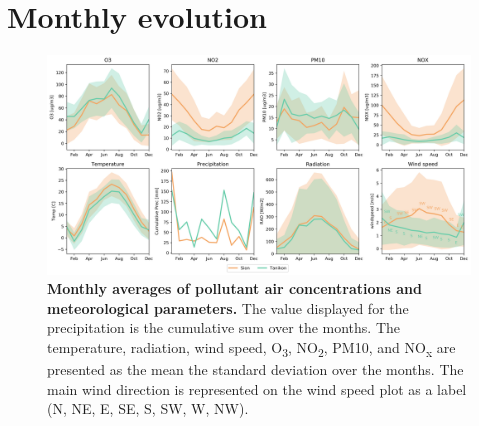 \documentclass[a4paper, 12pt]{article}
\begin{document}
\section{Monthly evolution} \label{monthly_section}
    
    \begin{figure}[t]
        \centering
        \includegraphics[width = 1 \textwidth]{Figures/monthly_avg2.png}
        \caption{\textbf{Monthly averages of pollutant air concentrations and meteorological parameters.} The value displayed for the precipitation is the cumulative sum over the months. The temperature, radiation, wind speed, O\textsubscript{3}, NO\textsubscript{2}, PM10, and NO\textsubscript{x} are presented as the mean \textpm the standard deviation over the months. The main wind direction is represented on the wind speed plot as a label (N, NE, E, SE, S, SW, W, NW).}
        \label{monthly_evolution}
    \end{figure}
    
\end{document}
